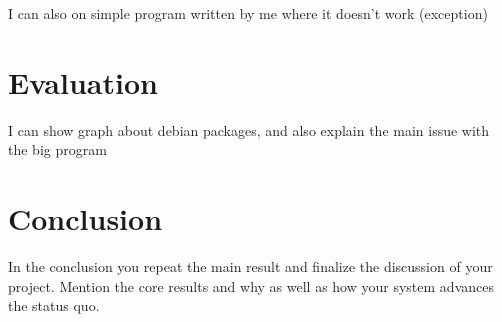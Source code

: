 \documentclass[a4paper,11pt,oneside]{report}
\begin{document}
I can also on simple program written by me where it
doesn't work (exception)



\chapter{Evaluation}
I can show graph about debian packages, and also explain the main issue with the big program



%



\chapter{Conclusion}

In the conclusion you repeat the main result and finalize the discussion of
your project. Mention the core results and why as well as how your system
advances the status quo.

\cleardoublepage
{}
{}
\printbibliography

%
%
\end{document}
